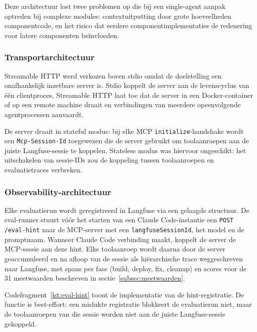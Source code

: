 Deze architectuur lost twee problemen op die bij een single-agent aanpak optreden bij complexe modules: contextuitputting door grote hoeveelheden componentcode, en het risico dat eerdere componentimplementaties de redenering voor latere componenten beïnvloeden.

\subsubsection{Transportarchitectuur}\label{subsubsec:transport}

Streamable HTTP werd verkozen boven stdio omdat de doelstelling een onafhankelijk inzetbare server is. Stdio koppelt de server aan de levenscyclus van één clientproces, Streamable HTTP laat toe dat de server in een Docker-container of op een remote machine draait en verbindingen van meerdere opeenvolgende agentprocessen aanvaardt.

De server draait in stateful modus: bij elke MCP \texttt{initialize}-handshake wordt een \texttt{Mcp-Session-Id} toegewezen die de server gebruikt om toolaanroepen aan de juiste Langfuse-sessie te koppelen. Stateless modus was hiervoor ongeschikt: het uitschakelen van sessie-IDs zou de koppeling tussen toolaanroepen en evaluatietraces verbreken.

\subsubsection{Observability-architectuur}\label{subsubsec:observability}

Elke evaluatierun wordt geregistreerd in Langfuse via een gelaagde structuur. De eval-runner stuurt vóór het starten van een Claude Code-instantie een \texttt{POST /eval-hint} naar de MCP-server met een \texttt{langfuseSessionId}, het model en de promptnaam. Wanneer Claude Code verbinding maakt, koppelt de server de MCP-sessie aan deze hint. Elke toolaanroep wordt daarna door de server geaccumuleerd en na afloop van de sessie als hiërarchische trace weggeschreven naar Langfuse, met spans per fase (build, deploy, fix, cleanup) en scores voor de 31 meetwaarden beschreven in sectie~\ref{subsec:meetwaarden}.

Codefragment~\ref{lst:eval-hint} toont de implementatie van de hint-registratie. De functie is best-effort: een mislukte registratie blokkeert de evaluatierun niet, maar de toolaanroepen van die sessie worden niet aan de juiste Langfuse-sessie gekoppeld.

